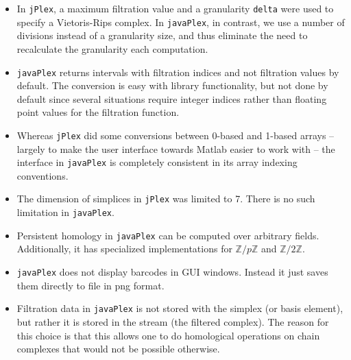 \documentclass[11pt]{amsart}
\newcommand\jPlex{\texttt{jPlex}\xspace}
\newcommand\javaPlex{\texttt{javaPlex}\xspace}
\begin{document}
\begin{itemize}
\item In \jPlex, a maximum filtration value and a granularity \texttt{delta} were used to specify a Vietoris-Rips complex. In \javaPlex, in contrast, we use a number of divisions instead of a granularity size, and thus eliminate the need to recalculate the granularity each computation. 
\item \javaPlex returns intervals with filtration indices and not filtration values by default. The conversion is easy with library functionality, but not done by default since several situations require integer indices rather than floating point values for the filtration function.
\item Whereas \jPlex did some conversions between 0-based and 1-based arrays -- largely to make the user interface towards Matlab easier to work with -- the interface in \javaPlex is completely consistent in its array indexing conventions.
\item The dimension of simplices in \jPlex was limited to 7. There is no such limitation in \javaPlex.
\item Persistent homology in \javaPlex can be computed over arbitrary fields. Additionally, it has specialized implementations for $\mathbb{Z}/p\mathbb{Z}$ and $\mathbb{Z}/2\mathbb{Z}$.
\item \javaPlex does not display barcodes in GUI windows. Instead it just saves them directly to file in png format.
\item Filtration data in \javaPlex is not stored with the simplex (or basis element), but rather it is stored in the stream (the filtered complex). The reason for this choice is that this allows one to do homological operations on chain complexes that would not be possible otherwise. 
\end{itemize}





\end{document}
